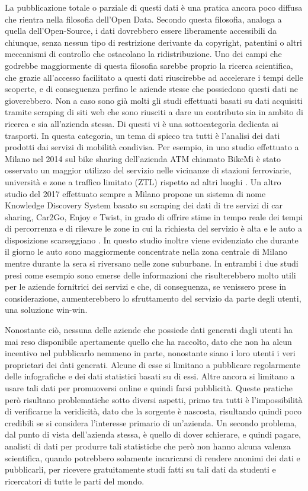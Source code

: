 La pubblicazione totale o parziale di questi dati è una pratica ancora poco diffusa che rientra nella filosofia dell'Open Data. Secondo questa filosofia, analoga a quella dell'Open-Source, i dati dovrebbero essere liberamente accessibili da chiunque, senza nessun tipo di restrizione derivante da copyright, patentini o altri meccanismi di controllo che ostacolano la ridistribuzione. Uno dei campi che godrebbe maggiormente di questa filosofia sarebbe proprio la ricerca scientifica, che grazie all'accesso facilitato a questi dati riuscirebbe ad accelerare i tempi delle scoperte, e di conseguenza perfino le aziende stesse che possiedono questi dati ne gioverebbero. Non a caso sono già molti gli studi effettuati basati su dati acquisiti tramite scraping di siti web che sono riusciti a dare un contributo sia in ambito di ricerca e sia all'azienda stessa. Di questi vi è una sottocategorìa dedicata ai trasporti. In questa categoria, un tema di spicco tra tutti è l'analisi dei dati prodotti dai servizi di mobilità condivisa. Per esempio, in uno studio effettuato a Milano nel 2014 sul bike sharing dell'azienda ATM chiamato BikeMi è stato osservato un maggior utilizzo del servizio nelle vicinanze di stazioni ferroviarie, università e zone a traffico limitato (ZTL) rispetto ad altri luoghi \cite{croci2014optimizing}. Un altro studio del 2017 effettuato sempre a Milano propone un sistema di nome Knowledge Discovery System basato su scraping dei dati di tre servizi di car sharing, Car2Go, Enjoy e Twist, in grado di offrire stime in tempo reale dei tempi di percorrenza e di rilevare le zone in cui la richiesta del servizio è alta e le auto a disposizione scarseggiano \cite{pagani2017knowledge}. In questo studio inoltre viene evidenziato che durante il giorno le auto sono maggiormente concentrate nella zona centrale di Milano mentre durante la sera si riversano nelle zone suburbane. In entrambi i due studi presi come esempio sono emerse delle informazioni che risulterebbero molto utili per le aziende fornitrici dei servizi e che, di conseguenza, se venissero prese in considerazione, aumenterebbero lo sfruttamento del servizio da parte degli utenti, una soluzione win-win.

Nonostante ciò, nessuna delle aziende che possiede dati generati dagli utenti ha mai reso disponibile apertamente quello che ha raccolto, dato che non ha alcun incentivo nel pubblicarlo nemmeno in parte, nonostante siano i loro utenti i veri proprietari dei dati generati. Alcune di esse si limitano a pubblicare regolarmente delle infografiche e dei dati statistici basati su di essi. Altre ancora si limitano a usare tali dati per promuoversi online e quindi farsi pubblicità. Queste pratiche però risultano problematiche sotto diversi aspetti, primo tra tutti è l'impossibilità di verificarne la veridicità, dato che la sorgente è nascosta, risultando quindi poco credibili se si considera l'interesse primario di un'azienda. Un secondo problema, dal punto di vista dell'azienda stessa, è quello di dover schierare, e quindi pagare, analisti di dati per produrre tali statistiche che però non hanno alcuna valenza scientifica, quando potrebbero solamente incaricarsi di rendere anonimi dei dati e pubblicarli, per ricevere gratuitamente studi fatti su tali dati da studenti e ricercatori di tutte le parti del mondo.

